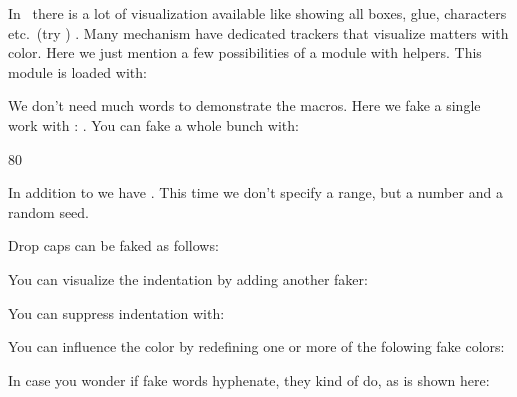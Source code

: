In \MKIV\ there is a lot of visualization available like showing all boxes, glue,
characters etc.\ (try \type {\showmakeup}) . Many mechanism have dedicated
trackers that visualize matters with color. Here we just mention a few
possibilities of a module with helpers. This module is loaded with:

\starttyping
\usemodule[visual]
\stoptyping

\subject{Faking words}

We don't need much words to demonstrate the macros. Here we fake a single work
with \type {\fakeword}: \fakeword. You can fake a whole bunch with:

\startbuffer
{} \par
{} {80} \par
{}
\stopbuffer

\typebuffer \getbuffer

In addition to \type {\fakewords} we have \type {\fakenwords}. This time we don't
specify a range, but a number and a random seed.

\startbuffer
{} %
\stopbuffer

\typebuffer \getbuffer

Drop caps can be faked as follows:

\startbuffer
{}
 \par
{}
\stopbuffer

\typebuffer \getbuffer

You can visualize the indentation by adding another faker:

\startbuffer
\fakeparindent {}
\stopbuffer

\typebuffer \getbuffer

You can suppress indentation with:

\startbuffer
{}
\stopbuffer

\typebuffer \getbuffer

You can influence the color by redefining one or more of the folowing fake
colors:

\startbuffer
\definecolor[fakerulecolor]     [black]
\definecolor[fakebaselinecolor] [green]
\definecolor[fakeparindentcolor][blue]
\stopbuffer

\typebuffer \getbuffer

In case you wonder if fake words hyphenate, they kind of do, as is shown here:
\bgroup \showfakewords {} \egroup


